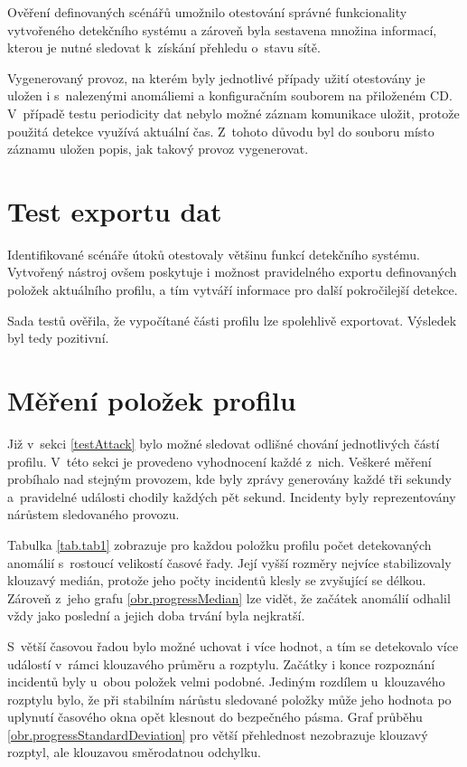   Ověření definovaných scénářů umožnilo otestování správné funkcionality vytvořeného detekčního
  systému a zároveň byla sestavena množina informací, kterou je nutné sledovat k~získání 
  přehledu o~stavu sítě.
  
  Vygenerovaný provoz, na kterém byly jednotlivé případy užití otestovány je uložen i s~nalezenými
  anomáliemi a konfiguračním souborem na přiloženém CD. V~případě testu periodicity dat nebylo možné záznam 
  komunikace uložit, protože použitá detekce využívá aktuální čas. Z~tohoto důvodu 
  byl do souboru místo záznamu uložen popis, jak takový provoz vygenerovat.

\section{Test exportu dat}
Identifikované scénáře útoků otestovaly většinu funkcí detekčního systému. Vytvořený nástroj
ovšem poskytuje i možnost pravidelného exportu definovaných položek aktuálního profilu, a tím 
vytváří informace pro další pokročilejší detekce. 

Sada testů ověřila, že vypočítané části profilu lze spolehlivě exportovat. Výsledek byl tedy
pozitivní.

\section{Měření položek profilu}
Již v~sekci \ref{testAttack} bylo možné sledovat odlišné chování 
jednotlivých částí profilu. V~této sekci je provedeno vyhodnocení každé z~nich. Veškeré 
měření probíhalo nad stejným provozem, kde byly zprávy generovány každé tři sekundy a~pravidelné
události chodily každých pět sekund. Incidenty byly reprezentovány nárůstem sledovaného provozu.

Tabulka \ref{tab.tab1} zobrazuje pro každou položku profilu počet detekovaných anomálií 
s~rostoucí velikostí časové řady. Její vyšší rozměry nejvíce stabilizovaly klouzavý medián, protože jeho počty
incidentů klesly se zvyšující se délkou. Zároveň z~jeho grafu \ref{obr.progressMedian} lze vidět,
že začátek anomálií odhalil vždy jako poslední a jejich doba trvání byla nejkratší. 

S~větší časovou řadou bylo možné uchovat i více hodnot, a 
tím se detekovalo více událostí v~rámci klouzavého průměru a rozptylu. Začátky i konce rozpoznání incidentů
byly u~obou položek velmi podobné. Jediným rozdílem u~klouzavého rozptylu bylo, že při stabilním 
nárůstu sledované položky může jeho hodnota po uplynutí časového okna opět klesnout do bezpečného pásma. 
Graf průběhu \ref{obr.progressStandardDeviation} pro větší přehlednost nezobrazuje klouzavý rozptyl, ale 
klouzavou směrodatnou odchylku. 

